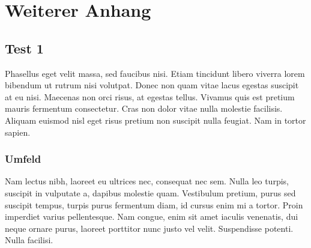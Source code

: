 \chapter{Weiterer Anhang}
\label{chap:anhang_B}

\section{Test 1}
Phasellus eget velit massa, sed faucibus nisi. Etiam tincidunt libero viverra lorem bibendum ut rutrum nisi volutpat. Donec non quam vitae lacus egestas suscipit at eu nisi. Maecenas non orci risus, at egestas tellus. Vivamus quis est pretium mauris fermentum consectetur. Cras non dolor vitae nulla molestie facilisis. Aliquam euismod nisl eget risus pretium non suscipit nulla feugiat. Nam in tortor sapien. 

\subsection{Umfeld}
Nam lectus nibh, laoreet eu ultrices nec, consequat nec sem. Nulla leo turpis, suscipit in vulputate a, dapibus molestie quam. Vestibulum pretium, purus sed suscipit tempus, turpis purus fermentum diam, id cursus enim mi a tortor. Proin imperdiet varius pellentesque. Nam congue, enim sit amet iaculis venenatis, dui neque ornare purus, laoreet porttitor nunc justo vel velit. Suspendisse potenti. Nulla facilisi.
